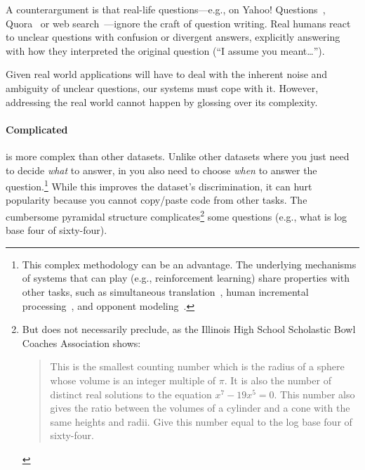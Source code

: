 A counterargument is that real-life questions---e.g., on Yahoo!
Questions~\cite{szpektor-13}, Quora~\cite{iyer-17} or web
search~\cite{kwiatkowski-19}---ignore the craft of question writing.
Real humans react to unclear questions with confusion or divergent
answers, explicitly answering with how they interpreted the original
question (``I assume you meant\dots'').

Given real world applications will have to deal with the inherent noise and ambiguity of unclear questions, our systems must cope with it. 
However, addressing the real world cannot happen by glossing over its complexity.




\paragraph{Complicated} 

\qb{} is more complex than other datasets.  
Unlike other datasets where you just need to decide \emph{what} to
answer, in \qb{} you also need to choose \emph{when} to answer the
question.\footnote{This complex methodology can be an advantage.  The
  underlying mechanisms of systems that can play \qb{} (e.g.,
  reinforcement learning) share properties with other tasks, such as
  simultaneous
  translation~\cite{grissom:he:boyd-graber:morgan-2014,ma-etal-2019-stacl},
  human incremental processing~\cite{levy-08,levy-11}, and opponent
  modeling~\cite{he-16}.}
While this improves the dataset's discrimination, it can hurt
popularity because you cannot copy/paste code from other 
tasks.
The cumbersome pyramidal structure complicates\footnote{But does not
  necessarily preclude, as the Illinois High School
  Scholastic Bowl Coaches Association shows:
\begin{quote}
    This is the smallest counting number which is the radius of a sphere whose volume is an integer multiple of $\pi$. It is also the number of distinct real solutions to the equation $x^7-19x^5=0$. This number also gives the ratio between the volumes of a cylinder and a cone with the same heights and radii. Give this number equal to the log base four of sixty-four.
\end{quote}} some questions (e.g.,
what is log base four of sixty-four).



